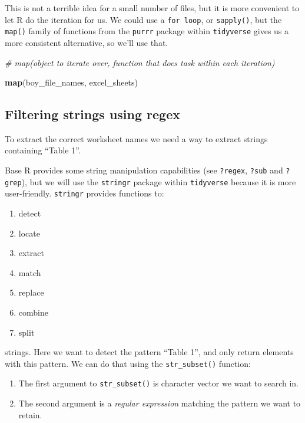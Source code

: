 \documentclass[]{book}
\newenvironment{Shaded}{\begin{snugshade}}{\end{snugshade}}
\newcommand{\CommentTok}[1]{\textcolor[rgb]{0.56,0.35,0.01}{\textit{#1}}}
\newcommand{\KeywordTok}[1]{\textcolor[rgb]{0.13,0.29,0.53}{\textbf{#1}}}
\newcommand{\NormalTok}[1]{#1}
\providecommand{\tightlist}{%
  \setlength{\itemsep}{0pt}\setlength{\parskip}{0pt}}
\begin{document}
This is not a terrible idea for a small number of files, but it is
more convenient to let R do the iteration for us. We could use a \texttt{for\ loop},
or \texttt{sapply()}, but the \texttt{map()} family of functions from the \texttt{purrr}
package within \texttt{tidyverse} gives us a more consistent alternative,
so we'll use that.

\begin{Shaded}
\begin{Highlighting}[]
\CommentTok{# map(object to iterate over, function that does task within each iteration)}

\KeywordTok{map}\NormalTok{(boy_file_names, excel_sheets)}
\end{Highlighting}
\end{Shaded}

\hypertarget{filtering-strings-using-regex}{%
\subsection{Filtering strings using regex}\label{filtering-strings-using-regex}}

To extract the correct worksheet names we need a way to extract
strings containing ``Table 1''.

Base R provides some string manipulation capabilities
(see \texttt{?regex}, \texttt{?sub} and \texttt{?grep}), but we will use the
\texttt{stringr} package within \texttt{tidyverse} because it is more
user-friendly. \texttt{stringr} provides functions to:

\begin{enumerate}
\def\labelenumi{\arabic{enumi}.}
\tightlist
\item
  detect
\item
  locate
\item
  extract
\item
  match
\item
  replace
\item
  combine
\item
  split
\end{enumerate}

strings. Here we want to detect the pattern ``Table 1'', and only
return elements with this pattern. We can do that using the
\texttt{str\_subset()} function:

\begin{enumerate}
\def\labelenumi{\arabic{enumi}.}
\tightlist
\item
  The first argument to \texttt{str\_subset()} is character vector we want to search in.
\item
  The second argument is a \emph{regular expression} matching the pattern we want to retain.
\end{enumerate}
\end{document}
